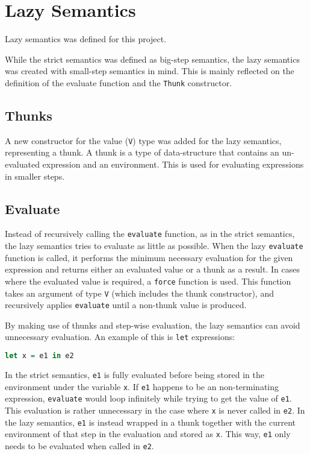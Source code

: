 \section{Lazy Semantics}
\label{LazySem}
Lazy semantics was defined for this project.

While the strict semantics was defined as big-step semantics, the lazy semantics
was created with small-step semantics in mind. This is mainly reflected on the
definition of the evaluate function and the \texttt{Thunk} constructor.

\subsection{Thunks}
A new constructor for the value (\texttt{V}) type was added for the lazy semantics, representing
a thunk. A thunk is a type of data-structure that contains an un-evaluated expression
and an environment\cite{Takano:2015:TRL:2695664.2695693}. This is used for evaluating
expressions in smaller steps.

\subsection{Evaluate}
Instead of recursively calling the \texttt{evaluate} function, as
in the strict semantics, the lazy semantics tries to evaluate as little as possible.
When the lazy \texttt{evaluate} function is called, it performs the minimum necessary evaluation
for the given expression and returns either an evaluated value or a thunk as a result.
In cases where the evaluated value is required, a \texttt{force} function is used.
This function takes an argument of type \texttt{V} (which includes the thunk constructor),
and recursively applies \texttt{evaluate} until a non-thunk value is produced.

By making use of thunks and step-wise evaluation, the lazy semantics can avoid unnecessary
evaluation. An example of this is \texttt{let} expressions:
\begin{lstlisting}[language=haskell]
  let x = e1 in e2
\end{lstlisting}
In the strict semantics, \texttt{e1} is fully evaluated before being stored in the
environment under the variable \texttt{x}. If \texttt{e1} happens to be an non-terminating
expression, \texttt{evaluate} would loop infinitely while trying to get the value of \texttt{e1}.
This evaluation is rather unnecessary in the case where \texttt{x} is never called in
\texttt{e2}. In the lazy semantics, \texttt{e1} is instead wrapped in a thunk together with
the current environment of that step in the evaluation and stored as \texttt{x}. This way,
\texttt{e1} only needs to be evaluated when called in \texttt{e2}.
